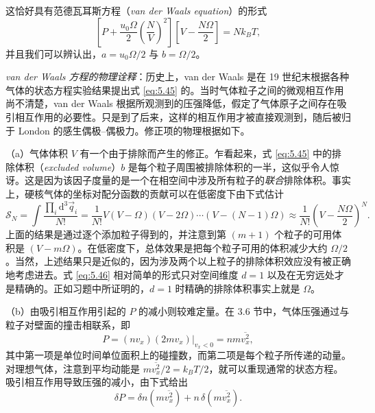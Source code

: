
这恰好具有范德瓦耳斯方程（\textit{van der Waals equation}）的形式
\begin{equation}\label{eq:5.45}
\left[P+\frac{u_0\Omega}{2}\left(\frac{N}{V}\right)^2\right]\left[V-\frac{N\Omega}{2}\right]=Nk_BT,
\end{equation}
并且我们可以辨认出，$a=u_0\Omega/2$ 与 $b=\Omega/2$。

\emph{van der Waals 方程的物理诠释}：历史上，van der Waals 是在 19 世纪末根据各种气体的状态方程实验结果提出式 \eqref{eq:5.45} 的。当时气体粒子之间的微观相互作用尚不清楚，van der Waals 根据所观测到的压强降低，假定了气体原子之间存在吸引相互作用的必要性。只是到了后来，这样的相互作用才被直接观测到，随后被归于 London 的感生偶极--偶极力。修正项的物理根据如下。

（a）气体体积 $V$ 有一个由于排除而产生的修正。乍看起来，式 \eqref{eq:5.45} 中的排除体积（\textit{excluded volume}）$b$ 是每个粒子周围被排除体积的一半，这似乎令人惊讶。这是因为该因子度量的是一个在相空间中涉及所有粒子的\emph{联合}排除体积。事实上，硬核气体的坐标对配分函数的贡献可以在低密度下由下式估计
\begin{equation}\label{eq:5.46}
\mathscr S_N=\int\frac{\prod_i\mathrm{d}^3\vec q_i}{N!}=\frac{1}{N!}V(V-\Omega)(V-2\Omega)\cdots(V-(N-1)\Omega)\approx\frac{1}{N!}\left(V-\frac{N\Omega}{2}\right)^N.
\end{equation}
上面的结果是通过逐个添加粒子得到的，并注意到第 $(m+1)$ 个粒子的可用体积是 $(V-m\Omega)$。在低密度下，总体效果是把每个粒子可用的体积减少大约 $\Omega/2$。当然，上述结果只是近似的，因为涉及两个以上粒子的排除体积效应没有被正确地考虑进去。式 \eqref{eq:5.46} 相对简单的形式只对空间维度 $d=1$ 以及在无穷远处才是精确的。正如习题中所证明的，$d=1$ 时精确的排除体积事实上就是 $\Omega$。

（b）由吸引相互作用引起的 $P$ 的减小则较难定量。在 3.6 节中，气体压强通过与粒子对壁面的撞击相联系，即
\begin{equation}\label{eq:5.47}
P=\left.(nv_x)(2mv_x)\right|_{v_x<0}=nm\overline{v_x^2},
\end{equation}
其中第一项是单位时间单位面积上的碰撞数，而第二项是每个粒子所传递的动量。对理想气体，注意到平均动能是 $m\overline{v_x^2}/2=k_BT/2$，就可以重现通常的状态方程。吸引相互作用导致压强的减小，由下式给出
\begin{equation}\label{eq:5.48}
\delta P=\delta n\left(m\overline{v_x^2}\right)+n\,\delta\left(m\overline{v_x^2}\right).
\end{equation}

